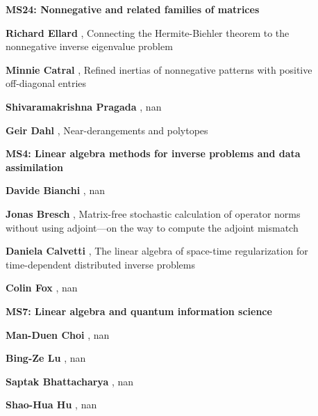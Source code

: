 \documentclass[ILAS2025-program.tex]{subfiles}
\begin{document}
\begin{description}
    \begin{description}
    \item[] {\color{mstitle}\textbf{MS24: Nonnegative and related families of matrices}} 
    \item[] \textbf{Richard Ellard} , Connecting the Hermite-Biehler theorem to the nonnegative inverse eigenvalue problem
        \item[] \textbf{Minnie Catral} , Refined inertias of nonnegative patterns with positive off-diagonal entries
        \item[] \textbf{Shivaramakrishna Pragada} , nan
        \item[] \textbf{Geir Dahl} , Near-derangements and polytopes
        \end{description}
    \begin{description}
    \item[] {\color{mstitle}\textbf{MS4: Linear algebra methods for inverse problems and data assimilation}} 
    \item[] \textbf{Davide Bianchi} , nan
        \item[] \textbf{Jonas Bresch} , Matrix-free stochastic calculation of operator norms without using adjoint---on the way to compute the adjoint mismatch
        \item[] \textbf{Daniela Calvetti} , The linear algebra of space-time regularization for time-dependent distributed inverse problems
        \item[] \textbf{Colin Fox} , nan
        \end{description}
    \begin{description}
    \item[] {\color{mstitle}\textbf{MS7: Linear algebra and quantum information science}} 
    \item[] \textbf{Man-Duen Choi} , nan
        \item[] \textbf{Bing-Ze Lu} , nan
        \item[] \textbf{Saptak Bhattacharya} , nan
        \item[] \textbf{Shao-Hua Hu} , nan
        \end{description}
    \begin{description}

\end{description}
\end{description}
\end{document}

